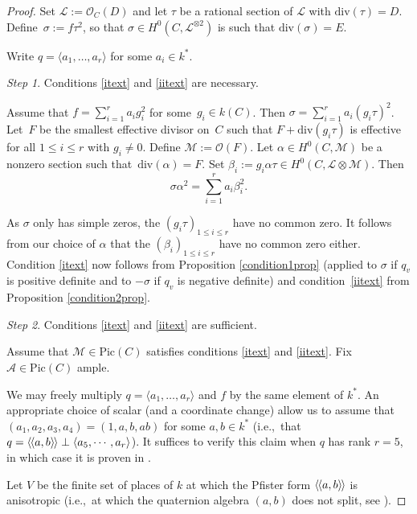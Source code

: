 \documentclass{amsart}
\theoremstyle{definition}
\theoremstyle{remark}
\newtheorem{Step}{Step}
\numberwithin{equation}{section}
\newcommand{\Pic}{\mathrm{Pic}}
\newcommand{\ddiv}{\mathrm{div}}
\newcommand{\llangle}{\langle\kern-.1em\langle}
\newcommand{\rrangle}{\rangle\kern-.1em\rangle}
\def\ie{i.e.,\ }
\def\cA{\mathcal{A}}
\def\cM{\mathcal{M}}
\def\cL{\mathcal{L}}
\def\cO{\mathcal{O}}
\def\cM{\mathcal{M}}
\begin{document}
\begin{proof}
Set $\cL:=\cO_C(D)$ and let $\tau$ be a rational section of $\cL$ with $\ddiv(\tau)=D$. Define~$\sigma:=f\tau^2$, so that $\sigma\in H^0(C,\cL^{\otimes 2})$ is such that $\ddiv(\sigma)=E$.

Write $q=\langle a_1,\dots, a_r\rangle$ for some $a_i\in k^*$. 

\begin{Step}
Conditions \ref{itext} and \ref{iitext} are necessary.
\end{Step}
Assume that $f=\sum_{i=1}^ra_ig_i^2$ for some~$g_i\in k(C)$. Then $\sigma=\sum_{i=1}^ra_i(g_i\tau)^2$.
Let~$F$ be the smallest effective divisor on~$C$ such that $F+\ddiv(g_i\tau)$ is effective for all $1\leq i\leq r$ with $g_i\neq 0$.
Define ${\cM:=\cO(F)}$. Let $\alpha\in H^0(C,\cM)$ be a nonzero section such that~$\ddiv(\alpha)=F$. Set $\beta_i:=g_i\alpha\tau\in H^0(C,\cL\otimes\cM)$. Then
\begin{equation}
\sigma\alpha^2=\sum_{i=1}^ra_i\beta_i^2.
\end{equation}

As $\sigma$ only has simple zeros, the $(g_i\tau)_{1\leq i\leq r}$ have no common zero. It follows from our choice of $\alpha$ that the $(\beta_i)_{1\leq i\leq r}$ have no common zero either. Condition \ref{itext} now 
follows from Proposition \ref{condition1prop} (applied to $\sigma$ if $q_v$ is positive definite and to $-\sigma$ if $q_v$ is negative definite) and condition~\ref{iitext} from Proposition \ref{condition2prop}.

\begin{Step}
Conditions \ref{itext} and \ref{iitext} are sufficient.
\end{Step}

Assume that $\cM\in\Pic(C)$ satisfies conditions \ref{itext} and \ref{iitext}. Fix $\cA\in \Pic(C)$ ample.

We may freely multiply $q=\langle a_1,\dots, a_r\rangle$ and $f$ by the same element of $k^*$. An appropriate choice of scalar (and a coordinate change) allow us to assume that $(a_1,a_2,a_3,a_4)=(1,a,b,ab)$ for some $a,b\in k^*$ (\ie that 
$q=\llangle a,b\rrangle\perp\langle a_5,\cdots,a_{r}\rangle$). It suffices to verify this claim when $q$ has rank $r=5$, in which case it is proven in \cite[Proposition 8]{Pourchet}.

Let $V$ be the finite set of places of $k$ at which the Pfister form $\llangle a,b\rrangle$ is anisotropic (\ie at which the quaternion algebra $(a,b)$ does not split, see \cite[III.2.7]{Lam}).


\end{proof}
\end{document}
